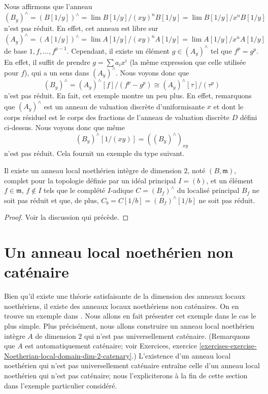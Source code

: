 \medskip\noindent
Nous affirmons que l'anneau
$$
(B_y)^\wedge = (B[1/y])^\wedge = \lim B[1/y]/(xy)^n B[1/y] =
\lim B[1/y] / x^n B[1/y]
$$
n'est pas réduit. En effet, cet anneau est libre sur
$$
(A_y)^\wedge = (A[1/y])^\wedge = \lim A[1/y]/(xy)^n A[1/y] =
\lim A[1/y] / x^n A[1/y]
$$
de base $1, f, \ldots, f^{p - 1}$. Cependant, il existe un
élément $g \in (A_y)^\wedge$ tel que $f^p = g^p$. En effet,
il suffit de prendre $g = \sum a_i x^i$ (la même expression que
celle utilisée pour $f$), qui a un sens dans $(A_y)^\wedge$.
Nous voyons donc que
$$
(B_y)^\wedge = (A_y)^\wedge[f]/(f^p - g^p) \cong
(A_y)^\wedge[\tau]/(\tau^p)
$$
n'est pas réduit. En fait, cet exemple montre un peu plus.
En effet, remarquons que $(A_y)^\wedge$ est un anneau de valuation discrète
d'uniformisante $x$ et dont le corps résiduel est le corps des fractions
de l'anneau de valuation discrète $D$ défini ci-dessus. Nous voyons donc que même
$$
(B_y)^\wedge[1/(xy)] = ((B_y)^\wedge)_{xy}
$$
n'est pas réduit. Cela fournit un exemple du type suivant.

\begin{lemma}
\label{lemma-nonreduced-recompletion}
Il existe un anneau local noethérien intègre de dimension $2$, noté $(B, \mathfrak m)$,
complet pour la topologie définie par un idéal principal $I = (b)$, et un
élément $f \in \mathfrak m$, $f \not \in I$ tels que
le complété $I$-adique $C = (B_f)^\wedge$ du localisé
principal $B_f$ ne soit pas réduit et que, de plus,
$C_b = C[1/b] = (B_f)^\wedge[1/b]$ ne soit pas réduit.
\end{lemma}

\begin{proof}
Voir la discussion qui précède.
\end{proof}








\section{Un anneau local noethérien non caténaire}
\label{section-non-catenary-Noetherian-local}

\noindent
Bien qu'il existe une théorie satisfaisante de la dimension des anneaux locaux noethériens,
il existe des anneaux locaux noethériens non caténaires. On en trouve un exemple dans
\cite[Appendix, exemple 2]{Nagata}. Nous allons en fait présenter cet exemple
dans le cas le plus simple. Plus précisément, nous allons construire un anneau local noethérien intègre $A$
de dimension $2$ qui n'est pas universellement caténaire. (Remarquons que $A$ est
automatiquement caténaire; voir
Exercices, exercice
\ref{exercises-exercise-Noetherian-local-domain-dim-2-catenary}.)
L'existence d'un anneau local noethérien qui n'est pas universellement
caténaire entraîne celle d'un anneau local noethérien qui n'est pas
caténaire; nous l'expliciterons à la fin de cette section
dans l'exemple particulier considéré.

